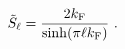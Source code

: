 \begin{equation}
\tilde{S}_{\ell} = \frac{2 k_{\rm F}}{\sinh (\pi \ell k_{\rm F})} \ .
\label{t13a}
\end{equation}


